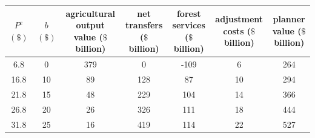 \begin{tabular}{ccccccc}
\toprule
\makecell[c]{$P^e$ \\ $(\$)$} & \makecell[c]{$b$ \\ $(\$)$} & \makecell[c]{agricultural \\ output value \\ ($\$$ billion)} & \makecell[c]{net \\ transfers \\ ($\$$ billion)} & \makecell[c]{forest \\ services \\ ($\$$ billion)} & \makecell[c]{adjustment \\ costs \\ ($\$$ billion)} & \makecell[c]{planner \\ value \\ ($\$$ billion)} \\
\midrule
 6.8 & 0 & 379 & 0 & -109 & 6 & 264 \\
 16.8 & 10 & 89 & 128 & 87 & 10 & 294 \\
 21.8 & 15 & 48 & 229 & 104 & 14 & 366 \\
 26.8 & 20 & 26 & 326 & 111 & 18 & 444 \\
 31.8 & 25 & 16 & 419 & 114 & 22 & 527 \\
\bottomrule
\end{tabular}
